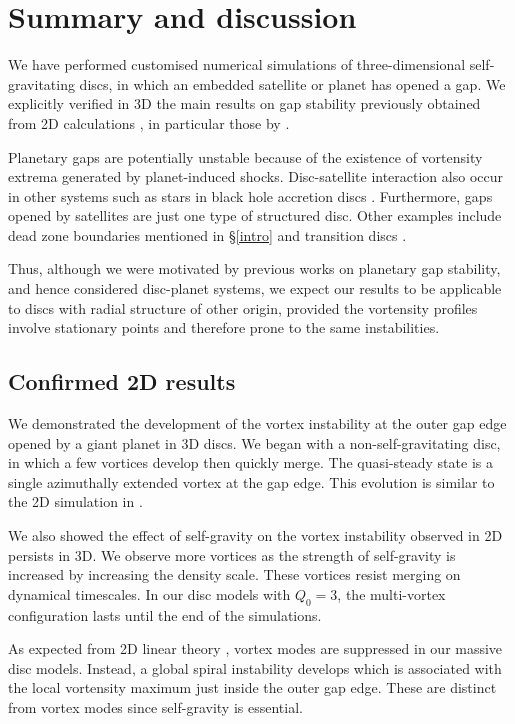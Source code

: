 \section{Summary and discussion}\label{summary}
We have performed customised numerical simulations of  
three-dimensional self-gravitating discs, in which an embedded 
satellite or planet has opened a gap. We explicitly verified in 
3D the main results on gap stability previously obtained from 
2D calculations \citep{koller03,li05,valborro07,meschiari08}, in
particular those by \cite{lin11a,lin11b}.  

Planetary gaps are potentially unstable because of the existence of 
vortensity extrema generated by planet-induced shocks. Disc-satellite
interaction also occur in other systems such as stars in black hole
accretion discs \citep{kocsis11,mckernan11,baruteau11b}.  Furthermore, 
gaps opened by satellites are just one type of structured disc. 
Other examples 
include dead zone boundaries mentioned in \S\ref{intro} and
transition discs \citep{regaly12}.  

Thus, although we were motivated by previous works on planetary gap 
stability, and hence considered disc-planet systems, we expect our
results to be applicable to discs with radial structure of other    
origin, provided the vortensity profiles involve stationary points and
therefore prone to the same instabilities.    

\subsection{Confirmed 2D results}
We demonstrated the development of the vortex instability
at the outer gap edge opened by a giant planet in 3D 
discs. We began with a non-self-gravitating disc, in which a few vortices
develop then quickly merge. The quasi-steady state is a single
azimuthally extended vortex at the gap edge. This evolution is similar
to the 2D simulation in \cite{valborro07}.  

We also showed the effect of self-gravity on the vortex
instability observed in 2D \citep{lyra09,lin11a} persists in 3D.
We observe more vortices as the strength of self-gravity is increased
by increasing the density scale. These vortices resist merging
on dynamical timescales. In our disc models with $Q_0=3$, the 
multi-vortex configuration lasts until the end of the
simulations.        

As expected from 2D linear theory \citep{lin11b}, 
vortex modes are suppressed in our massive disc models. Instead, a 
global spiral instability develops which is associated with the local
vortensity maximum just inside the outer gap edge. These are distinct
from vortex modes since self-gravity is essential. 

